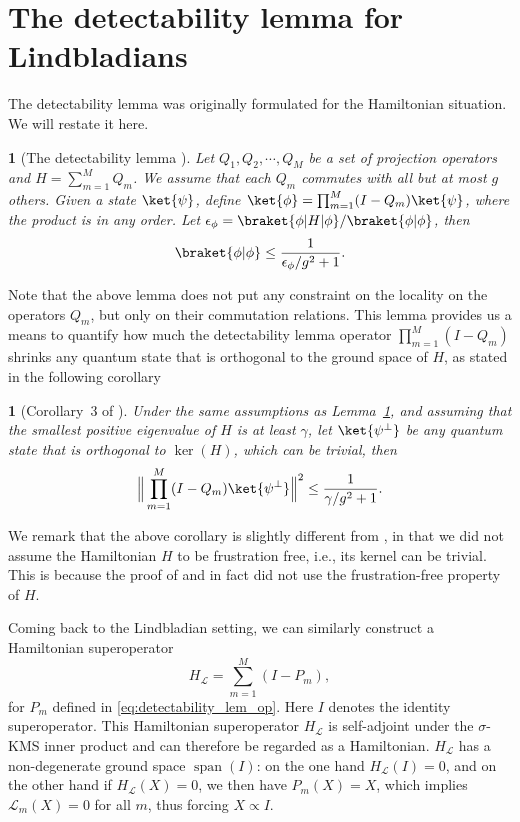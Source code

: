 \documentclass{article}
\theoremstyle{plain}
\newtheorem{lem}{\protect\lemmaname}
\theoremstyle{plain}
\theoremstyle{plain}
\theoremstyle{plain}
\theoremstyle{plain}
\theoremstyle{plain}
\newtheorem{cor}{\protect\corollaryname}
\theoremstyle{plain}
\providecommand{\corollaryname}{Corollary}
\providecommand{\lemmaname}{Lemma}
\DeclareMathOperator{\spanop}{span}
\begin{document}
\section{The detectability lemma for Lindbladians}
\label{sec:detectability_lemma}

The detectability lemma was originally formulated for the Hamiltonian situation. We will restate it here.
\begin{lem}[The detectability lemma \cite{AnshuAradVidick2016simple}]
    \label{lem:detectability_lemma}
    Let $Q_1,Q_2,\cdots,Q_M$ be a set of projection operators and $H=\sum_{m=1}^M Q_m$. We assume that each $Q_m$ commutes with all but at most $g$ others. Given a state $\ket{\psi}$, define $\ket{\phi}=\prod_{m=1}^M (I-Q_m)\ket{\psi}$, where the product is in any order. Let $\epsilon_\phi = \braket{\phi|H|\phi}/\braket{\phi|\phi}$, then
    \[
    \braket{\phi|\phi}\leq \frac{1}{\epsilon_\phi/g^2+1}.
    \]
\end{lem}
Note that the above lemma does not put any constraint on the locality on the operators $Q_m$, but only on their commutation relations. 
This lemma provides us a means to quantify how much the detectability lemma operator $\prod_{m=1}^M (I-Q_m)$ shrinks any quantum state that is orthogonal to the ground space of $H$, as stated in the following corollary
\begin{cor}[Corollary~3 of \cite{AnshuAradVidick2016simple}]
\label{cor:shrink}
    Under the same assumptions as Lemma~\ref{lem:detectability_lemma}, and assuming that the smallest positive eigenvalue of $H$ is at least $\gamma$, let $\ket{\psi^\perp}$ be any quantum state that is orthogonal to $\ker(H)$, which can be trivial, then
    \[
    \Big\|\prod_{m=1}^M (I-Q_m)\ket{\psi^\perp}\Big\|^2\leq \frac{1}{\gamma/g^2+1}.
    \]
\end{cor}
We remark that the above corollary is slightly different from \cite[Corollary~3]{AnshuAradVidick2016simple}, in that we did not assume the Hamiltonian $H$ to be frustration free, i.e., its kernel can be trivial. This is because the proof of \cite[Lemma~2]{AnshuAradVidick2016simple} and \cite[Corollary~3]{AnshuAradVidick2016simple} in fact did not use the frustration-free property of $H$.

Coming back to the Lindbladian setting, we can similarly construct a Hamiltonian superoperator
\begin{equation}
    \label{eq:ham_superpop}
    H_{\mathcal{L}} = \sum_{m=1}^M (I-P_m),
\end{equation}
for $P_m$ defined in \eqref{eq:detectability_lem_op}. Here $I$ denotes the identity superoperator. This Hamiltonian superoperator $H_{\mathcal{L}}$ is self-adjoint under the $\sigma$-KMS inner product and can therefore be regarded as a Hamiltonian. $H_{\mathcal{L}}$ has a non-degenerate ground space $\spanop(I)$: on the one hand $H_{\mathcal{L}}(I)=0$, and on the other hand if $H_{\mathcal{L}}(X)=0$, we then have $P_m(X)=X$, which implies $\mathcal{L}_m(X)=0$ for all $m$, thus forcing $X\propto I$.
\end{document}
